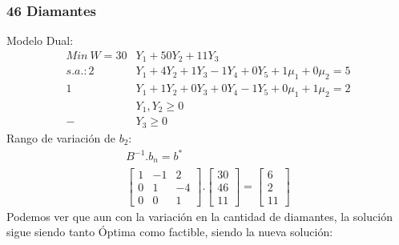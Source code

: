 \begin{homeworkProblem}
\subsubsection{46 Diamantes}
Modelo Dual:
\begin{align*}
    Min\ W = 30&Y_1 + 50Y_2 + 11Y_3 \\
    s.a.: 2&Y_1 + 4Y_2 + 1Y_3 - 1Y_4 + 0Y_5 + 1\mu_1 + 0\mu_2 = 5 \\ 
     1&Y_1 + 1Y_2 + 0Y_3 + 0Y_4 - 1Y_5 + 0\mu_1 + 1\mu_2 = 2 \\ 
     &Y_1,Y_2 \ge 0 \\ -&Y_3 \ge 0
\end{align*}
Rango de variación de $b_2$:
\begin{align*}
    B^{-1}.b_n = b^{*} \\
    \begin{bmatrix}
        1 & -1 & 2 \\
        0 & 1 & -4 \\
        0 & 0 & 1 
    \end{bmatrix}.
    \begin{bmatrix}
        30 \\
        46 \\
        11
    \end{bmatrix}=
    \begin{bmatrix}
        6 \\
        2\\
        11
    \end{bmatrix}
\end{align*}
Podemos ver que aun con la variación en la cantidad de diamantes, la solución sigue siendo tanto Óptima como factible, siendo la nueva solución:


\end{homeworkProblem}
